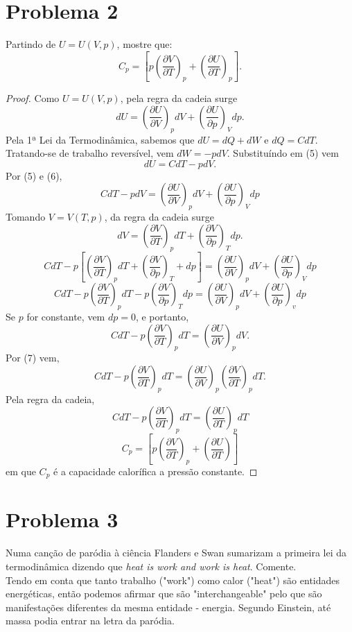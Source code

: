\documentclass[12pt, twoside, a4paper]{article}
\begin{document}
\section{Problema 2}
Partindo de $U=U(V,p)$, mostre que:
$$C_p=\left[p\left(\frac{\partial V}{\partial T}\right)_p+\left(\frac{\partial U}{\partial T}\right)_p\right]. $$

\begin{proof}
  Como $U=U(V,p)$, pela regra da cadeia surge
  \begin{equation}
     dU = \left(\frac{\partial U}{\partial V}\right)_p dV + \left(\frac{\partial U}{\partial p}\right)_V dp.
  \end{equation}
  Pela 1ª Lei da Termodinâmica, sabemos que $dU=dQ+dW$ e $dQ=CdT$. Tratando-se de trabalho reversível, vem $dW=-pdV$. Substituíndo em (5) vem
  \begin{equation}
    dU=CdT-pdV.
  \end{equation}
  Por (5) e (6),
  $$CdT-pdV=\left(\frac{\partial U}{\partial V}\right)_p dV+\left(\frac{\partial U}{\partial p}\right)_V dp $$
  Tomando $V=V(T,p)$, da regra da cadeia surge
  \begin{equation}
    dV=\left(\frac{\partial V}{\partial T}\right)_p dT + \left(\frac{\partial V}{\partial p}\right)_T dp.
  \end{equation}
  $$CdT-p\left[\left(\frac{\partial V}{\partial T}\right)_p dT + \left(\frac{\partial V}{\partial p}\right)_T + dp\right]=\left(\frac{\partial U}{\partial V}\right)_p dV + \left(\frac{\partial U}{\partial p}\right)_V dp $$
  $$CdT -p\left(\frac{\partial V}{\partial T}\right)_p dT - p\left(\frac{\partial V}{\partial p}\right)_T dp =\left(\frac{\partial U}{\partial V}\right)_p dV + \left(\frac{\partial U}{\partial p}\right)_v dp $$
  Se $p$ for constante, vem $dp = 0$, e portanto,
  $$CdT-p\left(\frac{\partial V}{\partial T}\right)_p dT = \left(\frac{\partial U}{\partial V}\right)_p dV. $$
  Por (7) vem,
  $$CdT-p\left(\frac{\partial V}{\partial T}\right)_p dT = \left(\frac{\partial U}{\partial V}\right)_p \left(\frac{\partial V}{\partial T}\right)_p dT. $$
  Pela regra da cadeia,
  $$CdT - p\left(\frac{\partial V}{\partial T}\right)_p dT = \left(\frac{\partial U}{\partial T}\right)_p dT $$
  $$C_p = \left[p\left(\frac{\partial V}{\partial T}\right)_p + \left(\frac{\partial U}{\partial T}\right)\right]$$
  em que $C_p$ é a capacidade calorífica a pressão constante.
\end{proof}

\section{Problema 3}
Numa canção de paródia à ciência Flanders e Swan sumarizam a primeira lei da termodinâmica dizendo que \textit{heat is work and work is heat}. Comente.\\
Tendo em conta que tanto trabalho ("work") como calor ("heat") são entidades energéticas, então podemos afirmar que são "interchangeable" pelo que são manifestações diferentes da mesma entidade - energia. Segundo Einstein, até massa podia entrar na letra da paródia.
\end{document}
